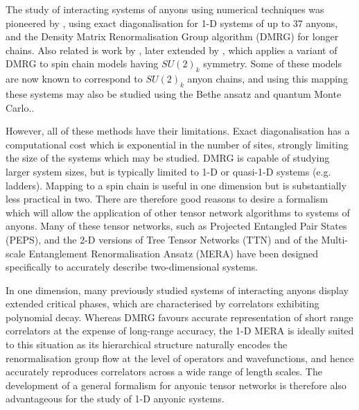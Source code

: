 \documentclass[aps,prb,reprint,superscriptaddress,amsfonts,amsmath,amssymb,showpacs,floatfix]{revtex4-1}
\newcommand{\prbtext}[1]{#1}
\newcommand{\pratext}[1]{}
\newcommand{\textcitecomma}[1]{\citeauthor{#1},\cite{#1}}
\newcommand{\citecomma}[1]{,\cite{#1}}
\newcommand{\citestop}[1]{.\cite{#1}}
\begin{document}
The study of interacting systems of anyons using numerical techniques was pioneered by \textcitecomma{feiguin2007} using exact diagonalisation for {1-D} systems of up to 37 anyons, and the Density Matrix Renormalisation Group algorithm (DMRG)\pratext{ }\cite{white1992} for longer chains. Also related is work by \textcitecomma{sierra1997} later extended by \textcitecomma{tatsuaki2000} which applies a variant of DMRG to spin chain models having $SU(2)_k$ symmetry. Some of these models are now known to correspond to $SU(2)_k$ anyon chains\citecomma{trebst2008} and using this mapping these systems may also be studied using the Bethe ansatz\pratext{ }\cite{alcaraz1987} and quantum Monte Carlo\citestop{todo2001}.

However, all of these methods have their limitations. Exact diagonalisation has a computational cost which is exponential in the number of sites, strongly limiting the size of the systems which may be studied. DMRG is capable of studying larger system sizes, but is typically limited to {1-D} or quasi-{1-D} systems (e.g. ladders). Mapping to a spin chain is useful in one dimension but is substantially less practical in two.
There are therefore good reasons to desire
a formalism which will allow the application of other tensor network algorithms %
to systems of anyons. 
Many of these tensor networks, such as 
Projected Entangled Pair States (PEPS)\citecomma{verstraete2004,nishino1998,gu2008,jiang2008,jordan2008}
and the 2-D versions of Tree Tensor Networks (TTN)\pratext{ }\cite{tagliacozzo2009} and of the Multi-scale Entanglement Renormalisation Ansatz (MERA)\pratext{ }\cite{cincio2008,evenbly2009b,evenbly2010}
have been designed specifically to accurately describe two-dimensional systems. 

In one dimension, 
many previously studied systems of interacting anyons display extended critical phases\pratext{ }\prbtext{,}\cite[e.g.][]{feiguin2007,trebst2008}\pratext{,} which are characterised by correlators exhibiting polynomial decay\citestop{difrancesco1997} 
Whereas DMRG favours accurate representation of short range correlators at the expense of long-range accuracy, 
the {1-D} MERA\pratext{ }\cite{vidal2007,vidal2008a} is ideally suited to this situation as its hierarchical structure naturally encodes the renormalisation group flow at the level of operators and wavefunctions\citecomma{vidal2007,vidal2008a,vidal2010,chen2010} and hence %
accurately reproduces correlators across a wide range of length scales\citestop{vidal2007,vidal2008a,giovannetti2008,pfeifer2009,evenbly2009} The development of a general formalism for anyonic tensor networks is therefore also advantageous for the study of {1-D} anyonic systems.
\end{document}
